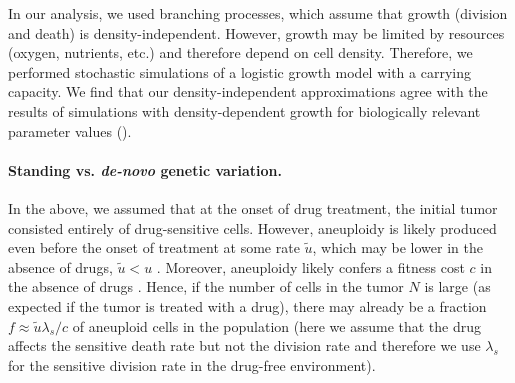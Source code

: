 \documentclass[12pt]{extarticle}
\begin{document}
In our analysis, we used branching processes, which assume that growth (division and death) is density-independent. However, growth may be limited by resources (oxygen, nutrients, etc.) and therefore depend on cell density. 
Therefore, we performed stochastic simulations of a logistic growth model with a carrying capacity. 
We find that our density-independent approximations agree with the results of simulations with density-dependent growth for biologically relevant parameter values ().

\paragraph*{Standing vs. \emph{de-novo} genetic variation.}

In the above, we assumed that at the onset of drug treatment, the initial tumor consisted entirely of drug-sensitive cells.
However, aneuploidy is likely produced even before the onset of treatment at some rate $\tilde{u}$, which may be lower in the absence of drugs, $\tilde{u} < u$ \citep{wang2019molecular,mason2017functional}. Moreover, aneuploidy likely confers a fitness cost $c$ in the absence of drugs \citep{replogle2020aneuploidy,giam2015aneuploidy}.
Hence, if the number of cells in the tumor $N$ is large (as expected if the tumor is treated with a drug), there may already be a fraction $f \approx \tilde{u}\lambda_s/c$ of aneuploid cells in the population (here we assume that the drug affects the sensitive death rate but not the division rate and therefore we use $\lambda_s$ for the sensitive division rate in the drug-free environment).
\end{document}
